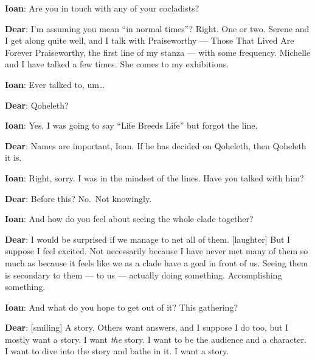 \textbf{Ioan}: Are you in touch with any of your cocladists?

\textbf{Dear}: I'm assuming you mean ``in normal times''? Right. One or two. Serene and I get along quite well, and I talk with Praiseworthy — Those That Lived Are Forever Praiseworthy, the first line of my stanza — with some frequency. Michelle and I have talked a few times. She comes to my exhibitions.

\textbf{Ioan}: Ever talked to, um\ldots{}

\textbf{Dear}: Qoheleth?

\textbf{Ioan}: Yes. I was going to say ``Life Breeds Life'' but forgot the line.

\textbf{Dear}: Names are important, Ioan. If he has decided on Qoheleth, then Qoheleth it is.

\textbf{Ioan}: Right, sorry. I was in the mindset of the lines. Have you talked with him?

\textbf{Dear}: Before this? No.~Not knowingly.

\textbf{Ioan}: And how do you feel about seeing the whole clade together?

\textbf{Dear}: I would be surprised if we manage to net all of them. {[}laughter{]} But I suppose I feel excited. Not necessarily because I have never met many of them so much as because it feels like we as a clade have a goal in front of us. Seeing them is secondary to them — to us — actually doing something. Accomplishing something.

\textbf{Ioan}: And what do you hope to get out of it? This gathering?

\textbf{Dear}: {[}smiling{]} A story. Others want answers, and I suppose I do too, but I mostly want a story. I want \emph{the} story. I want to be the audience and a character. I want to dive into the story and bathe in it. I want a story.
